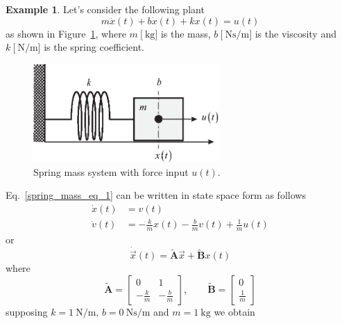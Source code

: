 \documentclass[11pt,a4paper,oneside]{book}
\numberwithin{equation}{section}
\theoremstyle{it}
\theoremstyle{definition}
\newtheorem{example}{Example}[chapter]
\begin{document}
\begin{example}
	Let's consider the following plant 
	\begin{equation}\label{spring_mass_eq_1}
		m\ddot{x}(t)+b\dot{x}(t)+kx(t)=u(t)
	\end{equation}
	as shown in Figure~\ref{spring_mass}, where $m\ \big[\SI{}{\kilogram}\big]$ is the mass, $b\ \Big[\SI{}{\newton\second\per\meter}\Big]$ is the viscosity and $k\ \Big[\SI{}{\newton\per\meter}\Big]$ is the spring coefficient.
	\begin{figure}[H]
		\centering
		\includegraphics[width = 200pt, 
		keepaspectratio]{figures/state_fb/spring_mass/spring_mass.eps}
		\captionsetup{width=0.5\textwidth, font=small}
		\caption{Spring mass system with force input $u(t)$.}
		\label{spring_mass}
	\end{figure}
	Eq.~\eqref{spring_mass_eq_1} can be written in state space form as follows
	\begin{equation}\label{spring_mass_eq_2}
		\begin{aligned}
			\dot{x}(t) &= v(t) \\[6pt]
			\dot{v}(t) &= -\frac{k}{m}x(t) -\frac{b}{m}v(t) + \frac{1}{m}u(t)
		\end{aligned}
	\end{equation}
	or
	\begin{equation}\label{spring_mass_eq_3}
		\dot{\vec{x}}(t) = \tilde{\mathbf{A}}\vec{x}+\tilde{\mathbf{B}}x(t)
	\end{equation}
	where
	\begin{equation}\label{spring_mass_eq_4}
		\tilde{\mathbf{A}} = \begin{bmatrix}
			0&1 \\[6pt] -\frac{k}{m} &  -\frac{b}{m}
		\end{bmatrix}, \qquad
		\tilde{\mathbf{B}} = \begin{bmatrix}
			0 \\[6pt] \frac{1}{m}
		\end{bmatrix}
	\end{equation}
	supposing $k=\SI{1}{\newton\per\meter}$, $b=\SI{0}{\newton\second\per\meter}$ and $m=\SI{1}{\kilogram}$ we obtain

\end{example}
\end{document}
